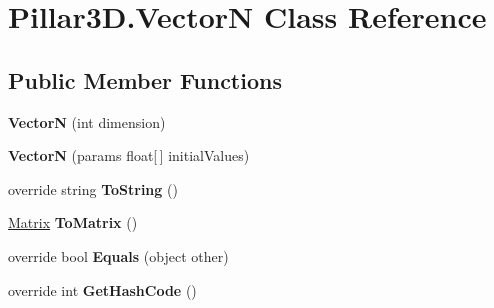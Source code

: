 \hypertarget{class_pillar3_d_1_1_vector_n}{}\section{Pillar3\+D.\+VectorN Class Reference}
\label{class_pillar3_d_1_1_vector_n}
\subsection*{Public Member Functions}
\begin{DoxyCompactItemize}
\item 
\mbox{\label{class_pillar3_d_1_1_vector_n_a874738a4b57eceb342596dce62b6218c}} 
{\bfseries VectorN} (int dimension)
\item 
\mbox{\label{class_pillar3_d_1_1_vector_n_a060053d25b1bc1ec00ce8fcc19714f80}} 
{\bfseries VectorN} (params float\mbox{[}$\,$\mbox{]} initial\+Values)
\item 
\mbox{\label{class_pillar3_d_1_1_vector_n_ae419187cd84c1500e97e8e45608e3700}} 
override string {\bfseries To\+String} ()
\item 
\mbox{\label{class_pillar3_d_1_1_vector_n_a8873ca858d99a7e53dc19a5a59e056d1}} 
\hyperlink{class_pillar3_d_1_1_matrix}{Matrix} {\bfseries To\+Matrix} ()
\item 
\mbox{\label{class_pillar3_d_1_1_vector_n_a3d06a84bb56736f21fbc24d22d6ba0e8}} 
override bool {\bfseries Equals} (object other)
\item 
\mbox{\label{class_pillar3_d_1_1_vector_n_ac1ccc8682c8787c64778575188334026}} 
override int {\bfseries Get\+Hash\+Code} ()
\end{DoxyCompactItemize}
